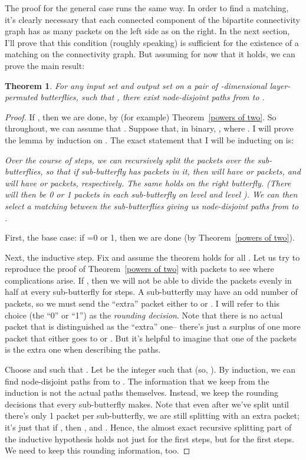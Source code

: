 \documentclass[12pt]{article}
\newtheorem{theorem}{Theorem}
\begin{document}
The proof for the general case runs the same way.  In order to find 
a matching, it's clearly necessary that each connected component
of the bipartite connectivity graph has as many packets 
on the left side as on the right.  
In the next section, I'll prove that this condition (roughly speaking)
is sufficient for the existence of a matching on the 
connectivity graph.
But assuming for now that it holds, we can prove the main result:
\begin{theorem} \label{main}
For any input set  and output set  on a pair of -dimensional 
layer-permuted butterflies,
such that , there exist node-disjoint paths from  to
.
\end{theorem}

\begin{proof}
If , then we are done, by (for example) 
Theorem~\ref{powers of two}.  So throughout, we can assume that
.
Suppose that, in binary, , where
.  I will prove the lemma by induction on .
The exact statement that I will be inducting on is: 

\emph{
Over the course of  steps, 
we can recursively split the packets over the sub-butterflies, 
so that if sub-butterfly  has  packets in it, then  will
have  or  packets, and  will
have  or  packets, respectively.
The same holds on the right butterfly.
(There will then be 0 or 1 packets in each sub-butterfly on level 
and level ).  We can then select a matching between the 
sub-butterflies giving us node-disjoint paths from  to .
}


First, the base case: if =0 or 1, then we are done (by 
Theorem~\ref{powers of two}).

Next, the inductive step.  Fix  and assume the theorem holds
for all .  Let us try to reproduce the proof of 
Theorem~\ref{powers of two} with  
packets to see where complications arise.  If , then
we will not be able to divide the packets evenly in half at every
sub-butterfly for  steps.  A sub-butterfly  may have an odd number of
packets, so we must send the ``extra'' packet either to  or .
I will refer to this choice (the ``0'' or ``1'') as the \emph{rounding
decision}.  Note that there is no actual packet that is distinguished
as the ``extra'' one-- there's just a surplus of one more packet that
either goes to  or .  But it's helpful to imagine that one
of the packets is the extra one when describing the paths.

Choose  and  such that
.   Let  be the integer such that 
 (so, ).  
By induction, we can find node-disjoint paths
from  to .  The information that we keep from the
induction is not the actual paths themselves.
Instead, we keep the rounding decisions that every sub-butterfly
makes.  Note that even after
we've split  until there's only 1 packet per sub-butterfly,
we are still splitting with an extra packet; it's just that if
, then , and .
Hence, the almost exact recursive splitting part of the inductive
hypothesis holds not just for the first  steps, but for the
first  steps.  We need to keep this rounding
information, too.


\end{proof}
\end{document}
